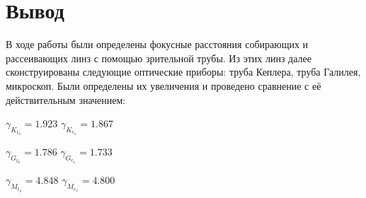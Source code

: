 \documentclass[a4paper]{article}
\begin{document}
\section{Вывод}
В ходе работы были определены фокусные расстояния собирающих и рассеивающих линз с помощью зрительной трубы. Из этих линз далее сконструированы следующие оптические приборы: труба Кеплера, труба Галилея, микроскоп. Были определены их увеличения и проведено сравнение с её действительным значением:

\begin{center}
    $\gamma_K_t_h = 1.923$ \hspace{1cm} $\gamma_K_e_x = 1.867$ \par \vspace{1cm} 
    $\gamma_G_t_h = 1.786$ \hspace{1cm} $\gamma_G_e_x = 1.733$ \par \vspace{1cm}  
    $\gamma_M_t_h = 4.848$ \hspace{1cm} $\gamma_M_e_x = 4.800$ 
    \end{center}
    
\end{document}
